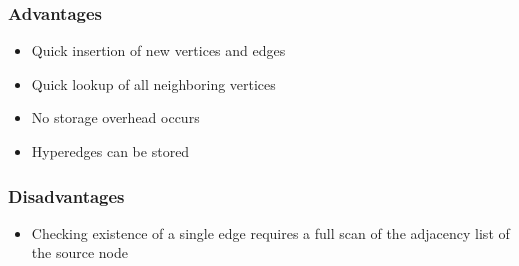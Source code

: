 \subsubsection{Advantages}
\begin{itemize}
    \item Quick insertion of new vertices and edges
    \item Quick lookup of all neighboring vertices
    \item No storage overhead occurs
    \item Hyperedges can be stored
\end{itemize}

\subsubsection{Disadvantages}
\begin{itemize}
    \item Checking existence of a single edge requires a full scan of the adjacency list of the source node
\end{itemize}

